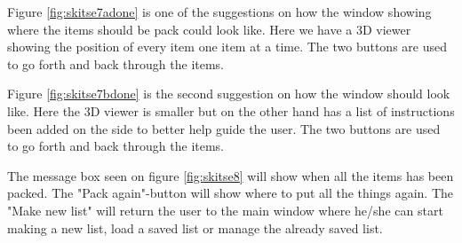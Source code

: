 Figure \ref{fig:skitse7adone} is one of the suggestions on how the window showing where the items should be pack could look like. Here we have a 3D viewer showing the position of every item one item at a time. The two buttons are used to go forth and back through the items.


Figure \ref{fig:skitse7bdone} is the second suggestion on how the window should look like. Here the 3D viewer is smaller but on the other hand has a list of instructions been added on the side to better help guide the user. The two buttons are used to go forth and back through the items.


The message box seen on figure \ref{fig:skitse8} will show when all the items has been packed. The "Pack again"-button will show where to put all the things again. The "Make new list" will return the user to the main window where he/she can start making a new list, load a saved list or manage the already saved list. 
